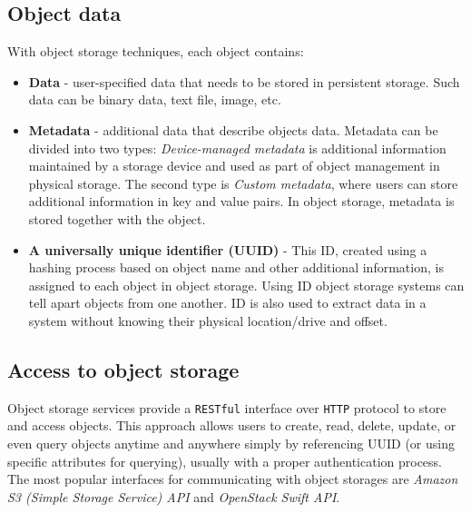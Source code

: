     \subsection*{Object data}
    With object storage techniques, each object contains\cite{ibmObjectStorage}:
    \begin{itemize}
      \item \textbf{Data} - user-specified data that needs to be stored in persistent storage. Such data can be binary data, text file, image, etc.
      \item \textbf{Metadata} - additional data that describe objects data. Metadata can be divided into two types: \textit{Device-managed metadata} is additional information maintained by a storage device and used as part of object management in physical storage\cite{objectBasedStorage}. The second type is \textit{Custom metadata}, where users can store additional information in key and value pairs. In object storage, metadata is stored together with the object.
      \item \textbf{A universally unique identifier (UUID)} - This ID, created using a hashing process based on object name and other additional information, is assigned to each object in object storage. Using ID object storage systems can tell apart objects from one another. ID is also used to extract data in a system without knowing their physical location/drive and offset.
    \end{itemize}

    \subsection*{Access to object storage}
    Object storage services provide a \texttt{RESTful} interface \cite{cloudObjectStorage} over \texttt{HTTP} protocol to store and access objects. This approach allows users to create, read, delete, update, or even query objects anytime and anywhere simply by referencing UUID (or using specific attributes for querying), usually with a proper authentication process. The most popular interfaces for communicating with object storages are \textit{Amazon S3 (Simple Storage Service) API} and \textit{OpenStack Swift API}.


